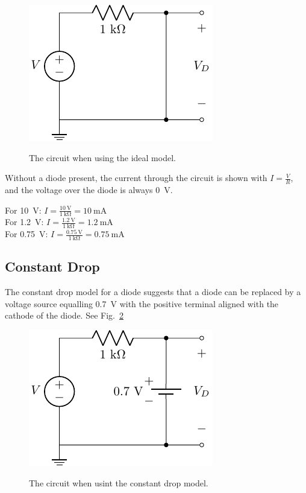 \documentclass{../../ece-report}
\begin{document}
\begin{figure}[h!]
  \centering
  \includegraphics{../circuits/circuit_ideal.pdf}
  \label{fig:ideal}
  \caption{The circuit when using the ideal model.}
\end{figure}

Without a diode present, the current through the circuit is shown
with $I = \frac{V}{R}$, and the voltage over the diode is always 0~V.

For 10~V: $I=\frac{10~\si{\V}}{1~\si{\kohm}} = 10~\si{\mA}$ \\
For 1.2~V: $I=\frac{1.2~\si{\V}}{1~\si{\kohm}} = 1.2~\si{\mA}$ \\
For 0.75~V: $I=\frac{0.75~\si{\V}}{1~\si{\kohm}} = 0.75~\si{\mA}$


\subsection{Constant Drop}

The constant drop model for a diode suggests that a diode
can be replaced by a voltage source equalling 0.7~V with the positive
terminal aligned with the cathode of the diode. See Fig.~\ref{fig:constant}

\begin{figure}[h~]
  \centering
  \includegraphics{../circuits/circuit_constant.pdf}
  \label{fig:constant}
  \caption{The circuit when usint the constant drop model.}
\end{figure}
\end{document}
